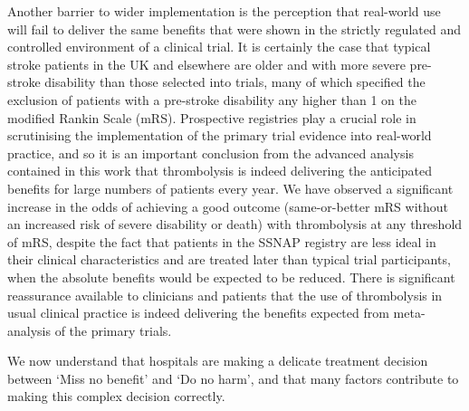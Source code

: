 Another barrier to wider implementation is the perception that real-world use will fail to deliver the same benefits that were shown in the strictly regulated and controlled environment of a clinical trial. It is certainly the case that typical stroke patients in the UK and elsewhere are older and with more severe pre-stroke disability than those selected into trials, many of which specified the exclusion of patients with a pre-stroke disability any higher than 1 on the modified Rankin Scale (mRS). Prospective registries play a crucial role in scrutinising the implementation of the primary trial evidence into real-world practice, and so it is an important conclusion from the advanced analysis contained in this work that thrombolysis is indeed delivering the anticipated benefits for large numbers of patients every year. We have observed a significant increase in the odds of achieving a good outcome (same-or-better mRS without an increased risk of severe disability or death) with thrombolysis at any threshold of mRS, despite the fact that patients in the SSNAP registry are less ideal in their clinical characteristics and are treated later than typical trial participants, when the absolute benefits would be expected to be reduced. There is significant reassurance available to clinicians and patients that the use of thrombolysis in usual clinical practice is indeed delivering the benefits expected from meta-analysis of the primary trials.

We now understand that hospitals are making a delicate treatment decision between ‘Miss no benefit’ and ‘Do no harm’, and that many factors contribute to making this complex decision correctly. 

